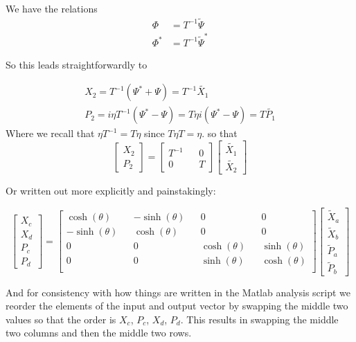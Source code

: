 \documentclass[12pt]{article}
\begin{document}
We have the relations
\begin{align*}
\Phi &= T^{-1} \tilde{\Psi}\\
\Phi^* &= T^{-1} \tilde{\Psi}^*
\end{align*}

So this leads straightforwardly to

\begin{align*}
X_2 = T^{-1}(\Psi^*+\Psi) = T^{-1} \tilde{X_1}\\
P_2 = i \eta T^{-1} (\Psi^* - \Psi) =   T \eta i (\Psi^*-\Psi) = T\tilde{P_1}
\end{align*}
Where we recall that $\eta T^{-1} = T \eta$ since $T\eta T = \eta$.
so that
\begin{equation}
\begin{bmatrix}
X_2\\P_2
\end{bmatrix}
=
\begin{bmatrix}
T^{-1} && 0\\
0 && T
\end{bmatrix}
\begin{bmatrix}
\tilde{X_1}\\\tilde{X_2}
\end{bmatrix}
\end{equation}

Or written out more explicitly and painstakingly:

\begin{equation}
\begin{bmatrix}
X_c\\X_d\\P_c\\P_d
\end{bmatrix}
=
\begin{bmatrix}
\cosh(\theta) && -\sinh(\theta) && 0 && 0\\
-\sinh(\theta) && \cosh(\theta) && 0 && 0\\
0 && 0 && \cosh(\theta) && \sinh(\theta)\\
0 && 0 && \sinh(\theta) && \cosh(\theta)\\
\end{bmatrix}
\begin{bmatrix}
\tilde{X}_a\\\tilde{X}_b\\\tilde{P}_a\\\tilde{P}_b
\end{bmatrix}
\end{equation}

And for consistency with how things are written in the Matlab analysis script we reorder the elements of the input and output vector by swapping the middle two values so that the order is $X_c$, $P_c$, $X_d$, $P_d$. This results in swapping the middle two columns and then the middle two rows.
\end{document}
